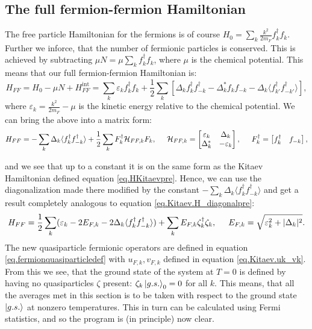 \subsection{The full fermion-fermion Hamiltonian} \label{subsec.HFFfull}
The free particle Hamiltonian for the fermions is of course $H_0 = \sum_k \frac{k^2}{2m_F} f^\dagger_k f_k$. Further we inforce, that the number of fermionic particles is conserved. This is achieved by subtracting $\mu N = \mu \sum_k f^\dagger_k f_k$, where $\mu$ is the chemical potential. This means that our full fermion-fermion Hamiltonian is:
\begin{equation}
H_{FF} = H_0-\mu N + H^\text{int}_{FF} = \sum_k \varepsilon_k f^\dagger_k f_k + \frac{1}{2}\sum_{k} \left[ \Delta_k f^\dagger_k f^\dagger_{-k} - \Delta^*_k f_k f_{-k} - \Delta_k \langle f^\dagger_{k'}f^\dagger_{-k'} \rangle \right], 
\label{eq.HFFdef}
\end{equation} 
where $\varepsilon_k = \frac{k^2}{2m_F}-\mu$ is the kinetic energy relative to the chemical potential. We can bring the above into a matrix form:
\begin{equation}
H_{FF} = -\sum_k \Delta_k\langle f^\dagger_k f^\dagger_{-k}\rangle + \frac{1}{2}\sum_{k} F_k^\dagger \mathcal{H}_{FF,k} F_k, \hspace{0.5cm} \mathcal{H}_{FF,k} = \begin{bmatrix} \varepsilon_k & \Delta_k \\ \Delta^*_k & -\varepsilon_k \end{bmatrix}, \hspace{0.5cm} F^\dagger_k = \begin{bmatrix} f_k^\dagger & f_{-k} \end{bmatrix}, 
\end{equation}

and we see that up to a constant it is on the same form as the Kitaev Hamiltonian defined equation \eqref{eq.HKitaevpre}. Hence, we can use the diagonalization made there modified by the constant $-\sum_k \Delta_k\langle f^\dagger_k f^\dagger_{-k}\rangle $ and get a result completely analogous to equation \eqref{eq.Kitaev.H_diagonalpre}: 
\begin{equation}
H_{FF} = \frac{1}{2}\sum_k (\varepsilon_k-2E_{F,k}-2\Delta_k\langle f^\dagger_k f^\dagger_{-k}\rangle) + \sum_k E_{F,k} \zeta^\dagger_k \zeta_k, \hspace{0.5cm} E_{F,k} = \sqrt{\varepsilon_k^2 + |\Delta_k|^2}.
\label{eq.Kitaev.HFF_diagonal}
\end{equation}
The new quasiparticle fermionic operators are defined in equation \eqref{eq.fermionquasiparticledef} with $u_{F,k},v_{F,k}$ defined in equation \eqref{eq.Kitaev.uk_vk}. From this we see, that the ground state of the system at $T=0$ is defined by having no quasiparticles $\zeta$ present: $\zeta_k \ket{g.s.}_0 = 0$ for all $k$. This means, that all the averages met in this section is to be taken with respect to the ground state $\ket{g.s.}$ at nonzero temperatures. This in turn can be calculated using Fermi statistics, and so the program is (in principle) now clear. 




